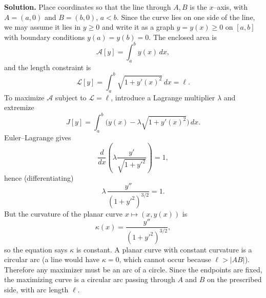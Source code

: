 \documentclass[12pt,a4paper]{article}
\theoremstyle{plain}
\theoremstyle{definition}      %
\begin{document}
	\medskip
	\noindent\textbf{Solution.}
	Place coordinates so that the line through $A,B$ is the $x$--axis, with $A=(a,0)$ and $B=(b,0)$, $a<b$.
	Since the curve lies on one side of the line, we may assume it lies in $y\ge 0$ and write it as a graph
	$y=y(x)\ge 0$ on $[a,b]$ with boundary conditions $y(a)=y(b)=0$.
	The enclosed area is
	\[
	\mathcal A[y]=\int_a^b y(x)\,dx,
	\]
	and the length constraint is
	\[
	\mathcal L[y]=\int_a^b \sqrt{1+y'(x)^2}\,dx=\ell.
	\]
	To maximize $\mathcal A$ subject to $\mathcal L=\ell$, introduce a Lagrange multiplier $\lambda$ and extremize
	\[
	J[y]=\int_a^b\Big(y(x)-\lambda\sqrt{1+y'(x)^2}\Big)\,dx.
	\]
	Euler--Lagrange gives
	\[
	\frac{d}{dx}\left(\lambda\frac{y'}{\sqrt{1+y'^2}}\right)=1,
	\]
	hence (differentiating)
	\[
	\lambda\,\frac{y''}{(1+y'^2)^{3/2}}=1.
	\]
	But the curvature of the planar curve $x\mapsto (x,y(x))$ is
	\[
	\kappa(x)=\frac{y''}{(1+y'^2)^{3/2}},
	\]
	so the equation says $\kappa$ is constant. A planar curve with constant curvature is a circular arc
	(a line would have $\kappa=0$, which cannot occur because $\ell>|AB|$). Therefore any maximizer must be an arc of a circle.
	Since the endpoints are fixed, the maximizing curve is a circular arc passing through $A$ and $B$ on the prescribed side,
	with arc length $\ell$.
	
	\bigskip
	
	
\end{document}

